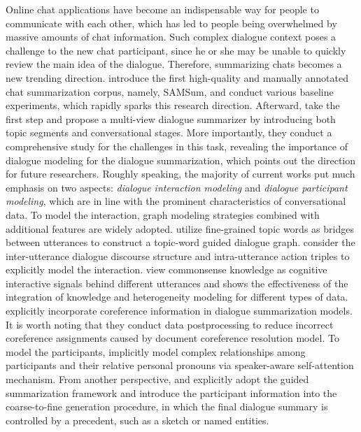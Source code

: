 \label{sec:chat}
Online chat applications have become an indispensable way for people to communicate with each other, which has led to people being overwhelmed by massive amounts of chat information.
Such complex dialogue context poses a challenge to the new chat participant, since he or she may be unable to quickly review the main idea of the dialogue.
Therefore, summarizing chats becomes a new trending direction.
 introduce the first high-quality and manually annotated chat summarization corpus, namely, SAMSum, and conduct various baseline experiments, which rapidly sparks this research direction. Afterward,  take the first step and propose a multi-view dialogue summarizer by introducing both topic segments and conversational stages. More importantly, they conduct a comprehensive study for the challenges in this task, revealing the importance of dialogue modeling for the dialogue summarization, which points out the direction for future researchers.
Roughly speaking, the majority of current works put much emphasis on two aspects: \textit{dialogue interaction modeling} and \textit{dialogue participant modeling}, which are in line with the prominent characteristics of conversational data.
To model the interaction, graph modeling strategies combined with additional features are widely adopted.
 utilize fine-grained topic words as bridges between utterances to construct a topic-word guided dialogue graph.
 consider the inter-utterance dialogue discourse structure and intra-utterance action triples to explicitly model the interaction. 
 view commonsense knowledge as cognitive interactive signals behind different utterances and shows the effectiveness of the integration of knowledge and heterogeneity modeling for different types of data.
 explicitly incorporate coreference information in dialogue summarization models. It is worth noting that they conduct data postprocessing to reduce incorrect coreference assignments caused by document coreference resolution model.
To model the participants,  implicitly model complex relationships among participants and their relative personal pronouns via speaker-aware self-attention mechanism. 
From another perspective,  and  explicitly adopt the guided summarization framework and introduce the participant information into the coarse-to-fine generation procedure, in which the final dialogue summary is controlled by a precedent, such as a sketch or named entities. 
